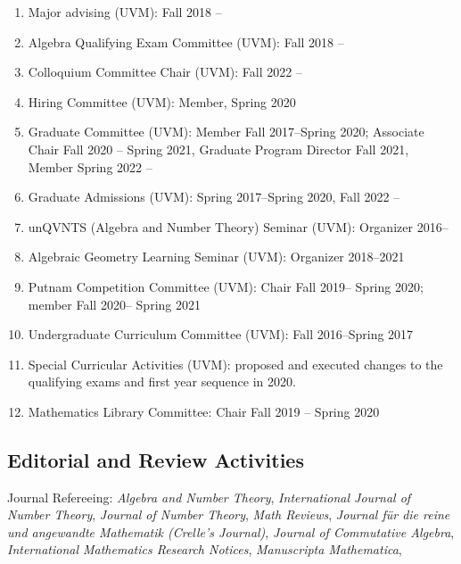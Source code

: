 \documentclass[a4paper,10pt]{article}
\begin{document}
\begin{enumerate}
	\item Major advising (UVM): Fall 2018 --
	\item Algebra Qualifying Exam Committee (UVM): Fall 2018 --
	\item Colloquium Committee Chair (UVM): Fall 2022 --
	\item Hiring Committee (UVM): Member, Spring 2020
	\item Graduate Committee (UVM): Member Fall 2017--Spring 2020; Associate Chair Fall 2020 -- Spring 2021, Graduate Program Director Fall 2021, Member Spring 2022 -- 
	\item Graduate Admissions (UVM): Spring 2017--Spring 2020, Fall 2022 --
	\item unQVNTS (Algebra and Number Theory) Seminar (UVM): Organizer 2016--
	\item Algebraic Geometry Learning Seminar (UVM): Organizer 2018--2021
	\item Putnam Competition Committee (UVM): Chair Fall 2019-- Spring 2020; member Fall 2020-- Spring 2021
	\item Undergraduate Curriculum Committee (UVM): Fall 2016--Spring 2017 
	\item Special Curricular Activities (UVM): proposed and executed changes to the qualifying exams and first year sequence in 2020. 
	\item Mathematics Library Committee:  Chair Fall 2019 -- Spring 2020
\end{enumerate}

\subsection*{Editorial and Review Activities}
Journal Refereeing: \emph{Algebra and Number Theory}, \emph{International Journal of Number Theory}, \emph{Journal of Number Theory}, \emph{Math Reviews}, \emph{Journal für die reine und angewandte Mathematik (Crelle’s Journal)}, \emph{Journal of Commutative Algebra}, \emph{International Mathematics Research Notices}, \emph{Manuscripta Mathematica}, \emph{}
\end{document}
